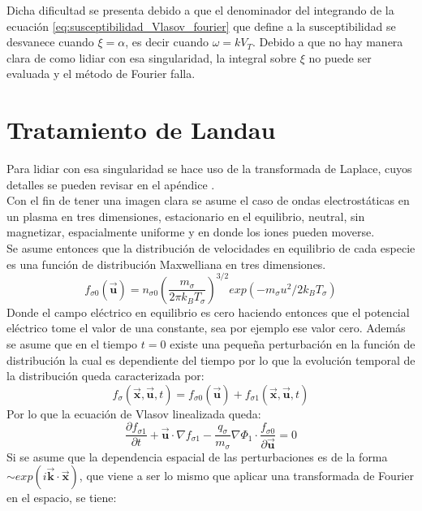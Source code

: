 \documentclass[../tesis_main_file.tex]{subfiles}
\begin{document}
Dicha dificultad se presenta debido a que el denominador del integrando de la ecuación \ref{eq:susceptibilidad_Vlasov_fourier} que define a la susceptibilidad se desvanece cuando $\xi=\alpha$, es decir cuando $\omega = kV_T$. Debido a que no hay manera clara de como lidiar con esa singularidad, la integral sobre $\xi$ no puede ser evaluada y el método de Fourier falla.
\section{Tratamiento de Landau}
Para lidiar con esa singularidad se hace uso de la transformada de Laplace, cuyos detalles se pueden revisar en el apéndice \notinsubfile{\ref{Ap:Laplace}}.\\
Con el fin de tener una imagen clara se asume el caso de ondas electrostáticas en un plasma en tres dimensiones, estacionario en el equilibrio, neutral, sin magnetizar, espacialmente uniforme y en donde los iones pueden moverse.\\
Se asume entonces que la distribución de velocidades en equilibrio de cada especie es una función de distribución Maxwelliana en tres dimensiones.
\begin{equation}
\label{eq:dist_max_3D}
f_{\sigma 0}(\overrightarrow{\textbf{u}})=n_{\sigma 0} \left(\frac{m_{\sigma}}{2\pi k_B T_{\sigma}}\right)^{3/2}exp(-m_{\sigma}u^2/2k_BT_{\sigma})
\end{equation}
Donde el campo eléctrico en equilibrio es cero haciendo entonces que el potencial eléctrico tome el valor de una constante, sea por ejemplo ese valor cero. Además se asume que en el tiempo $t=0$ existe una pequeña perturbación en la función de distribución la cual es dependiente del tiempo por lo que la evolución temporal de la distribución queda caracterizada por:
\begin{equation}
f_{\sigma}(\overrightarrow{\textbf{x}},\overrightarrow{\textbf{u}},t)=f_{\sigma 0}(\overrightarrow{\textbf{u}})+f_{\sigma 1}(\overrightarrow{\textbf{x}},\overrightarrow{\textbf{u}},t)
\end{equation}
Por lo que la ecuación de Vlasov linealizada queda:
\begin{equation}
\frac{\partial f_{\sigma 1}}{\partial t}+ \overrightarrow{\textbf{u}} \cdot \nabla f_{\sigma 1} -\frac{q_{\sigma}}{m_{\sigma}}\nabla \Phi _1 \cdot \frac{f_{\sigma 0}}{\partial  \overrightarrow{\textbf{u}}}=0
\end{equation}
Si se asume que la dependencia espacial de las perturbaciones es de la forma $\sim exp(i\overrightarrow{\textbf{k}}\cdot \overrightarrow{\textbf{x}})$, que viene a ser lo mismo que aplicar una transformada de Fourier en el espacio, se tiene:
\end{document}
